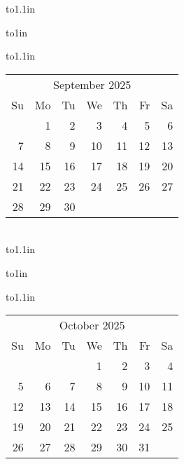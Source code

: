 \documentclass[12pt]{article}
\begin{document}
\begin{center}
{\month\hspace*{0.5in}%
\def\month{\hbox to1.1in{%
\vbox to1in{%
\vfil  \hbox to1.1in{%
\hfil\scriptsize\begin{tabular}{@{\hspace{0mm}}r@{\hspace{1mm}}r@{\hspace{1mm}}r@{\hspace{1mm}}r@{\hspace{1mm}}r@{\hspace{1mm}}r@{\hspace{1mm}}r@{\hspace{0mm}}}%
\multicolumn{7}{c}{September 2025}\\[1mm]
Su & Mo & Tu & We & Th & Fr & Sa\\[0.7mm]
 & 1 & 2 & 3 & 4 & 5 & 6\\[0.5mm]
7 & 8 & 9 & 10 & 11 & 12 & 13\\[0.5mm]
14 & 15 & 16 & 17 & 18 & 19 & 20\\[0.5mm]
21 & 22 & 23 & 24 & 25 & 26 & 27\\[0.5mm]
28 & 29 & 30 & 
\end{tabular}\hfil}\vfil}}}%
\month\hspace*{0.5in}%
\\[0.5in]%
\def\month{\hbox to1.1in{%
\vbox to1in{%
\vfil  \hbox to1.1in{%
\hfil\scriptsize\begin{tabular}{@{\hspace{0mm}}r@{\hspace{1mm}}r@{\hspace{1mm}}r@{\hspace{1mm}}r@{\hspace{1mm}}r@{\hspace{1mm}}r@{\hspace{1mm}}r@{\hspace{0mm}}}%
\multicolumn{7}{c}{October 2025}\\[1mm]
Su & Mo & Tu & We & Th & Fr & Sa\\[0.7mm]
 &  &  & 1 & 2 & 3 & 4\\[0.5mm]
5 & 6 & 7 & 8 & 9 & 10 & 11\\[0.5mm]
12 & 13 & 14 & 15 & 16 & 17 & 18\\[0.5mm]
19 & 20 & 21 & 22 & 23 & 24 & 25\\[0.5mm]
26 & 27 & 28 & 29 & 30 & 31 & 
\end{tabular}\hfil}\vfil}}}%
\month\hspace*{0.5in}%
\def\month{\hbox to1.1in{%
\vbox to1in{%
\vfil  \hbox to1.1in{%
}}}}}
\end{center}
\end{document}

